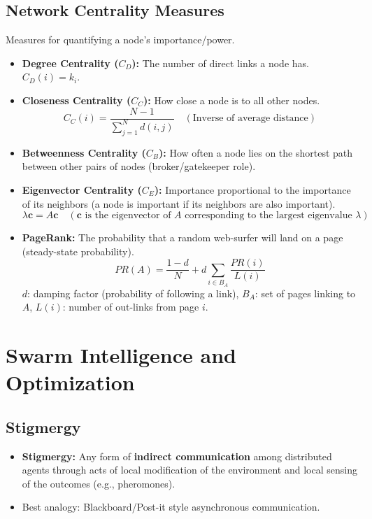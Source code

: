 \documentclass{report}
\begin{document}
\section*{Network Centrality Measures}
Measures for quantifying a node's importance/power.
\begin{itemize}
    \item \textbf{Degree Centrality ($C_D$):} The number of direct links a node has. $C_D(i) = k_i$.
    \item \textbf{Closeness Centrality ($C_C$):} How close a node is to all other nodes.
    \[
    C_C(i) = \frac{N-1}{\sum_{j=1}^{N} d(i,j)} \quad (\text{Inverse of average distance})
    \]
    \item \textbf{Betweenness Centrality ($C_B$):} How often a node lies on the shortest path between other pairs of nodes (broker/gatekeeper role).
    \item \textbf{Eigenvector Centrality ($C_E$):} Importance proportional to the importance of its neighbors (a node is important if its neighbors are also important).
    \[
    \lambda \mathbf{c} = A\mathbf{c} \quad (\mathbf{c} \text{ is the eigenvector of } A \text{ corresponding to the largest eigenvalue } \lambda)
    \]
    \item \textbf{PageRank:} The probability that a random web-surfer will land on a page (steady-state probability).
    \[
    PR(A) = \frac{1-d}{N} + d \sum_{i \in B_A} \frac{PR(i)}{L(i)}
    \]
    $d$: damping factor (probability of following a link), $B_A$: set of pages linking to $A$, $L(i)$: number of out-links from page $i$.
\end{itemize}

\chapter*{Swarm Intelligence and Optimization}

\section*{Stigmergy}
\begin{itemize}
    \item \textbf{Stigmergy:} Any form of \textbf{indirect communication} among distributed agents through acts of local modification of the environment and local sensing of the outcomes (e.g., pheromones).
    \item Best analogy: Blackboard/Post-it style asynchronous communication.
\end{itemize}
\end{document}
